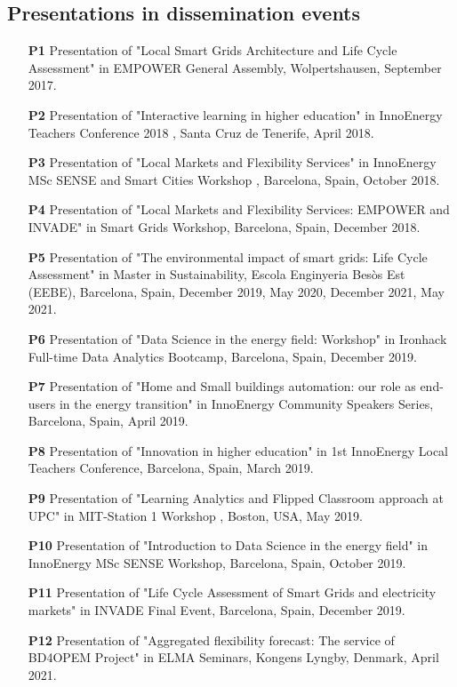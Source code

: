 \subsection*{Presentations in dissemination events}
\begin{itemize}
	\item [\textbf{P1}] Presentation of "Local Smart Grids Architecture and Life Cycle Assessment" in EMPOWER General Assembly, Wolpertshausen, September 2017.		
	\item [\textbf{P2}] Presentation of "Interactive learning in higher education" in InnoEnergy Teachers Conference 2018 , Santa Cruz de Tenerife, April 2018.	
	\item [\textbf{P3}] Presentation of "Local Markets and Flexibility Services" in InnoEnergy MSc SENSE and Smart Cities Workshop , Barcelona, Spain, October 2018.	
	\item [\textbf{P4}] Presentation of "Local Markets and Flexibility Services: EMPOWER and INVADE" in Smart Grids Workshop, Barcelona, Spain, December 2018.	
	\item [\textbf{P5}] Presentation of "The environmental impact of smart grids: Life Cycle Assessment" in Master in Sustainability, Escola Enginyeria Bes\`{o}s Est (EEBE), Barcelona, Spain, December 2019, May 2020, December 2021, May 2021.
	\item [\textbf{P6}] Presentation of "Data Science in the energy field: Workshop" in Ironhack Full-time Data Analytics Bootcamp, Barcelona, Spain, December 2019.
	\item [\textbf{P7}] Presentation of "Home and Small buildings automation: our role as end-users in the energy transition" in InnoEnergy Community Speakers Series, Barcelona, Spain, April 2019.
	\item [\textbf{P8}] Presentation of "Innovation in higher education" in 1st InnoEnergy Local Teachers Conference, Barcelona, Spain, March 2019.
	\item [\textbf{P9}] Presentation of "Learning Analytics and Flipped Classroom approach at UPC" in MIT-Station 1 Workshop , Boston, USA, May 2019.	
	\item [\textbf{P10}] Presentation of "Introduction to Data Science in the energy field" in InnoEnergy MSc SENSE Workshop, Barcelona, Spain, October 2019.
	\item [\textbf{P11}] Presentation of "Life Cycle Assessment of Smart Grids and electricity markets" in INVADE Final Event, Barcelona, Spain, December 2019.
	\item [\textbf{P12}] Presentation of "Aggregated flexibility forecast: The service of BD4OPEM Project" in ELMA Seminars, Kongens Lyngby, Denmark, April 2021.

\end{itemize}
